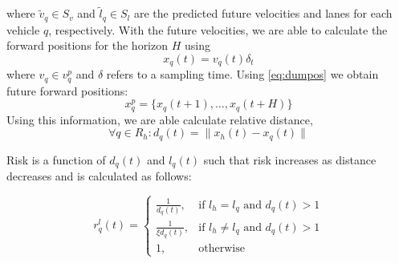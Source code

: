 \documentclass[letterpaper, 10 pt, conference]{ieeeconf}  %
\newcommand\NB[1]{$\spadesuit$\footnote{NB: #1}}
\newcommand\RP[1]{$\clubsuit$\footnote{RP: #1}}
\begin{document}
where $\tilde{v}_q\in S_v$ and $\tilde{l}_q\in S_l$ are the predicted future velocities and lanes for each vehicle $q$, respectively.
With the future velocities, we are able to calculate the forward positions for the horizon $H$ using %
\begin{equation} \label{eq:dumpos}
    x_q(t) = v_q(t)\delta_t
\end{equation}
where $v_q\in v_q^p$ and $\delta$ refers to a sampling time. Using \eqref{eq:dumpos} we obtain future forward positions:
\begin{equation}
    x_q^p = \{x_q(t+1),\ldots,x_q(t+H)\}
\end{equation}
Using this information, we are able calculate relative distance,
\begin{equation}
    \forall q \in R_h: d_q(t) = \lVert x_h(t)-x_q(t)\rVert
\end{equation}




Risk is a function of $d_q(t)$ and $l_q(t)$ %
such that risk increases as distance decreases and is calculated as follows:

\begin{equation}
    r_{q}^{l}(t) =
    \begin{cases}
    \frac{1}{d_{q}(t)},  & \text{if } l_h=l_q \text{ and } d_{q}(t) > 1  \\
    \frac{1}{\xi d_{q}(t)},  & \text{if } l_h\neq l_q \text{ and } d_{q}(t) > 1  \\
        1,                     & \text{otherwise}  
    \end{cases}
\end{equation}
\end{document}
